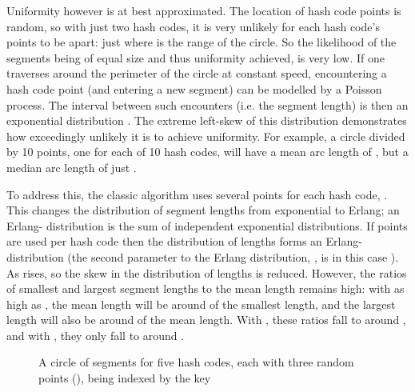 \documentclass[runningheads,a4paper]{llncs}
\newcommand{\slice}[3]{

  \draw (0,0) -- (#1:1) arc (#1:#2:1);
  \draw (0,0) -- (#1:1.1);

  \node at (#1:1.3) {#3};
}
\begin{document}
Uniformity however is at best approximated. The location of hash code
points is random, so with just two hash codes, it is very unlikely for
each hash code's points to be  apart: just  where 
is the range of the circle. So the likelihood of the segments being of
equal size and thus uniformity achieved, is very low. If one traverses
around the perimeter of the circle at constant speed, encountering a
hash code point (and entering a new segment) can be modelled by a
Poisson process. The interval between such encounters (i.e. the
segment length) is then an exponential distribution
\cite{Niedermayer2005,Xiaouien2009}. The extreme left-skew of this
distribution demonstrates how exceedingly unlikely it is to achieve
uniformity. For example, a circle divided by 10 points, one for each
of 10 hash codes, will have a mean arc length of , but a
median arc length of just .

To address this, the classic algorithm uses several points for each
hash code, . This changes the
distribution of segment lengths from exponential to Erlang; an
Erlang- distribution is the sum of  independent exponential
distributions. If  points are used per hash code then the
distribution of lengths forms an Erlang- distribution (the second
parameter to the Erlang distribution, , is in this case ). As  rises, so the skew in the distribution of lengths
is reduced. However, the ratios of smallest and largest segment
lengths to the mean length remains high: with  as high as ,
the mean length will be around  of the smallest length, and the
largest length will also be around  of the mean length. With , these ratios fall to around , and with , they only fall to around .

\begin{figure}
\begin{center}
\end{center}
\caption{A circle of segments for five hash codes, each with three
  random points (), being indexed by the key }
\label{fig:circle-multi-point}
\end{figure}
\end{document}
